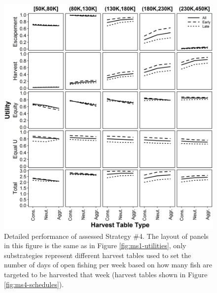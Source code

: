 \documentclass[12pt,]{book}
\theoremstyle{definition}
\theoremstyle{definition}
\theoremstyle{definition}
\theoremstyle{remark}
\begin{document}
\begin{singlespace}
\clearpage
\begin{figure}
  \centering
  \includegraphics{img/Ch3/Values_4.jpg}
  \caption{Detailed performance of assessed Strategy \#4. The layout of panels in this figure is the same as in Figure \ref{fig:ms1-utilities}, only substrategies represent different harvest tables used to set the number of days of open fishing per week based on how many fish are targeted to be harvested that week (harvest tables shown in Figure \ref{fig:ms4-schedules}).}
  \label{fig:ms4-utilities}
\end{figure}


\end{singlespace}
\end{document}
